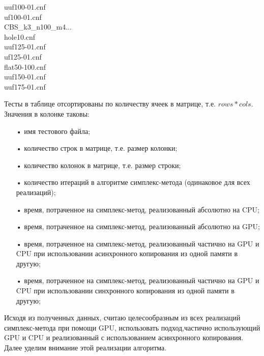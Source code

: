 \documentclass[a4paper,14pt,russian]{extreport}
\begin{document}
\begin{tabbing}
  uuf100-01.cnf							 \\
  uf100-01.cnf							 \\
  CBS\_k3\_n100\_m4...							 \\
  hole10.cnf							 \\
  uuf125-01.cnf							 \\
  uf125-01.cnf							 \\
  flat50-100.cnf							 \\
  uuf150-01.cnf							 \\
  uuf175-01.cnf							
  \end{tabbing}
\par Тесты в таблице отсортированы по количеству ячеек в матрице, т.е. $rows * cols$. Значения в колонке таковы: 
  \begin{itemize}
  \item[•] имя тестового файла;
  \item[•] количество строк в матрице, т.е. размер колонки;
  \item[•] количество колонок в матрице, т.е. размер строки;
  \item[•] количество итераций в алгоритме симплекс-метода (одинаковое для всех реализаций);
  \item[•] время, потраченное на симплекс-метод, реализованный абсолютно на CPU;
  \item[•] время, потраченное на симплекс-метод, реализованный абсолютно на GPU;
  \item[•] время, потраченное на симплекс-метод, реализованный частично на GPU и CPU при использовании асинхронного копирования из одной памяти в другую;
  \item[•] время, потраченное на симплекс-метод, реализованный частично на GPU и CPU при использовании синхронного копирования из одной памяти в другую;
  \end{itemize}
\par Исходя из полученных данных, считаю целесообразным из всех реализаций симплекс-метода при помощи GPU, использовать подход,частично использующий GPU и CPU и реализованный с использованием асинхронного копирования. Далее уделим внимание этой реализации алгоритма. 
\end{document}
